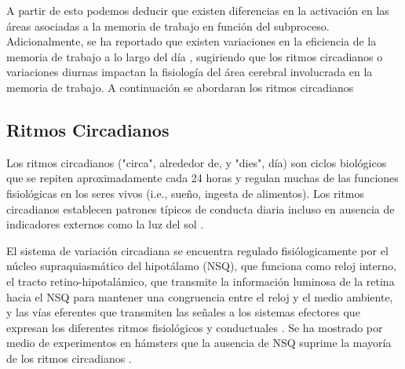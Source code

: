 \documentclass[12pt,letterpaper,final]{article}
\let\cite\cite %
\begin{document}


A partir de esto podemos deducir que existen diferencias en la activación en las áreas asociadas a la memoria de trabajo en función del subproceso. Adicionalmente, se ha reportado que existen variaciones en la eficiencia de la memoria de trabajo a lo largo del día \cite{Baddeley1970,Folkard1980,Folkard1983,Ramirez2006,Valdez2012,Valdez2014,Schmidt2015}, sugiriendo que los ritmos circadianos o variaciones diurnas impactan la fisiología del área cerebral involucrada en la memoria de trabajo. A continuación se abordaran los ritmos circadianos

\subsection{Ritmos Circadianos}
Los ritmos circadianos ("circa", alrededor de, y "dies", día) son ciclos biológicos que se repiten aproximadamente cada 24 horas y regulan muchas de las funciones fisiológicas en los seres vivos (i.e., sueño, ingesta de alimentos). Los ritmos circadianos establecen patrones típicos de conducta diaria incluso en ausencia de indicadores externos como la luz del sol \cite{Carlson2014}.

El sistema de variación circadiana se encuentra regulado fisiólogicamente por el núcleo supraquiasmático del hipotálamo (NSQ), que funciona como reloj interno, el tracto retino-hipotalámico, que transmite la información luminosa de la retina hacia el NSQ para mantener una congruencia entre el reloj y el medio ambiente, y las vías eferentes que transmiten las señales a los sistemas efectores que expresan los diferentes ritmos fisiológicos y conductuales \cite{AngelesCastellanos2007}. Se ha mostrado por medio de experimentos en hámsters que la ausencia de NSQ suprime la mayoría de los ritmos circadianos \cite{Silver1996}.
\end{document}
